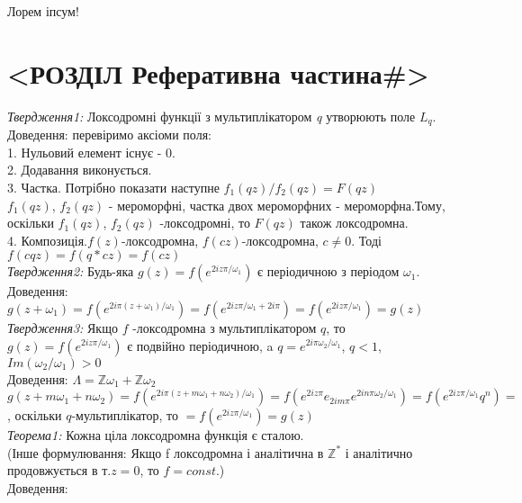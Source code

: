 \documentclass[12pt,a4paper]{article}
\begin{document}
Лорем іпсум!\cite{alias}

\clearpage

\section{<РОЗДІЛ Реферативна частина\#>}

\emph{Твердження1:} Локсодромні функції з мультиплікатором \textit{q} утворюють поле $L_{q}$. \\
Доведення: перевіримо аксіоми поля:\\
1. Нульовий елемент існує - 0.\\
2. Додавання виконується.\\
3. Частка. Потрібно показати наступне $f_{1}(qz)/f_{2}(qz)=F(qz)$\\
$f_{1}(qz)$, $f_{2}(qz)$ - мероморфні, частка двох мероморфних - мероморфна.Тому, оскільки $f_{1}(qz)$, $f_{2}(qz)$ -локсодромні, то $ F(qz)$ також локсодромна.\\
4. Композиція.$f(z)$-локсодромна, $f(cz)$-локсодромна, $c \neq 0$. Тоді  $f(cqz)=f(q*cz)=f(cz)$\\

\emph{Твердження2:} Будь-яка $g(z)=f(e^{2iz\pi/\omega_{1}})$ є періодичною з періодом $\omega_{1}$.\\
Доведення: $g(  z+\omega_{1}  ) = f(  e^{  2i\pi (z+\omega_{1})  / \omega_{1}  }  ) =  f(  e^{  2iz\pi / \omega_{1}  +2i\pi } ) = f(  e^{  2iz\pi / \omega_{1}  } ) = g(z)$ \\

\emph{Твердження3:} Якщо $f$  -локсодромна з мультиплікатором $q$, то  $g(z)=f(e^{2iz\pi/\omega_{1}})$ є подвійно періодичною, a $q=e^{2i\pi \omega_{2}/ \omega_{1}}$, $q<1$, $Im(\omega_{2}/\omega_{1})>0$\\
Доведення: $ \Lambda = \mathbb{Z}\omega_{1} + \mathbb{Z}\omega_{2} $ \\
$g(z+m\omega_{1}+ n\omega_{2})= f(e^{2i\pi(z+m\omega_{1}+ n\omega_{2})/\omega_{1}})=f( e^{2iz\pi}e_{2im\pi}e^{2in\pi\omega_{2} / \omega_{1}} )=f(e^{2iz\pi/\omega_{1}}q^{n})= $, оскільки $q$-мультиплікатор, то
 $=f(e^{2iz\pi/\omega_{1}})=g(z)$\\
 
\emph{Теорема1:} Кожна ціла локсодромна функція є сталою.\\
(Інше формулювання: Якщо f локсодромна і аналітична в $\mathbb{Z}^{*}$ і аналітично продовжується в т.$z=0$, то $f=const$.)\\
Доведення:\\
\\
\end{document}
